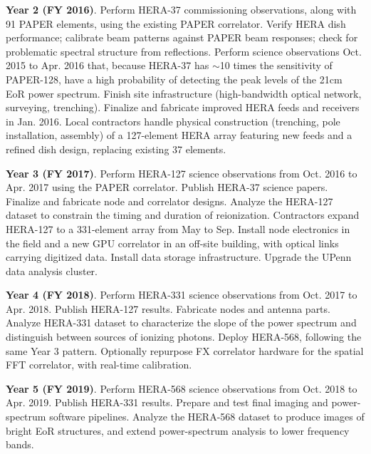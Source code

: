 \documentclass[preprint]{aastex}
\begin{document}
{\bf Year 2 (FY 2016)}.  Perform HERA-37 commissioning observations, 
along with 91 PAPER elements, using the existing PAPER correlator.
Verify HERA dish performance; calibrate beam
patterns against PAPER beam responses; check for problematic
spectral structure from reflections.  Perform science observations
Oct. 2015 to Apr. 2016 that, because HERA-37 has $\sim$10 times the sensitivity of
PAPER-128, have a high probability of
detecting the peak levels of the 21cm EoR power spectrum.   Finish site
infrastructure (high-bandwidth optical network, surveying, trenching).
Finalize and fabricate improved HERA feeds and receivers in Jan.  2016.
Local contractors handle
physical construction (trenching, pole installation, assembly) of
a 127-element HERA array featuring new feeds and a refined dish design,
replacing existing 37 elements.  

{\bf Year 3 (FY 2017)}.  Perform HERA-127 
science observations from Oct. 2016 to Apr. 2017 using the PAPER correlator.
Publish HERA-37 science papers.   Finalize and fabricate node and correlator designs.
Analyze the HERA-127 dataset to constrain the timing
and duration of reionization.  Contractors expand HERA-127 to a 331-element array
from May to Sep.
Install node electronics in the field and a new
GPU correlator in an off-site building,
with optical links carrying digitized data.
Install data storage infrastructure.  Upgrade the UPenn data analysis cluster.

{\bf Year 4 (FY 2018)}.  Perform HERA-331 science observations from 
Oct. 2017 to Apr. 2018.  Publish HERA-127 results.
Fabricate nodes and antenna parts. Analyze HERA-331
dataset to characterize 
the slope of the power spectrum and distinguish between 
sources of ionizing photons.  Deploy HERA-568, following the same
Year 3 pattern.  Optionally repurpose FX correlator hardware 
for the spatial FFT correlator, with real-time calibration.

{\bf Year 5 (FY 2019)}.  Perform HERA-568 science observations from Oct. 2018
to Apr. 2019.  Publish HERA-331 results.  
Prepare and test final imaging and power-spectrum software pipelines. 
Analyze the HERA-568 dataset to produce images of bright EoR structures,
and extend power-spectrum analysis to lower frequency bands.

\vspace{-0.25in}
\end{document}
